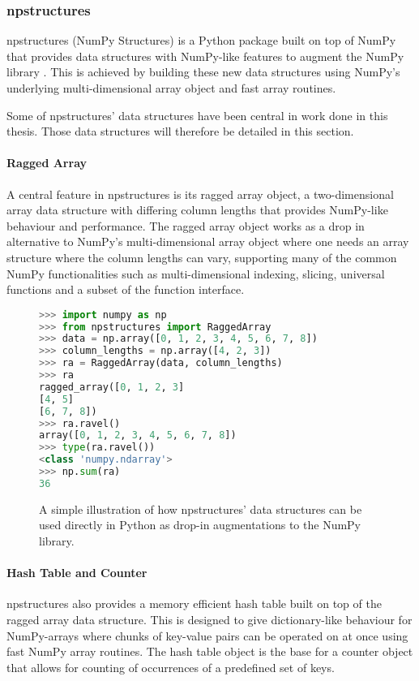 \subsubsection{npstructures} \label{background:implementation_tools_and_libraries:npstructures}
npstructures (NumPy Structures) is a Python package built on top of NumPy that provides data structures with NumPy-like features to augment the NumPy library \cite{npstructures}.
This is achieved by building these new data structures using NumPy's underlying multi-dimensional array object and fast array routines.

Some of npstructures' data structures have been central in work done in this thesis.
Those data structures will therefore be detailed in this section.

\paragraph{Ragged Array}
A central feature in npstructures is its ragged array object, a two-dimensional array data structure with differing column lengths that provides NumPy-like behaviour and performance.
The ragged array object works as a drop in alternative to NumPy's multi-dimensional array object where one needs an array structure where the column lengths can vary, supporting many of the common NumPy functionalities such as multi-dimensional indexing, slicing, universal functions and a subset of the function interface.
\begin{figure}[H]
\begin{lstlisting}[language=Python,style=console]
>>> import numpy as np
>>> from npstructures import RaggedArray
>>> data = np.array([0, 1, 2, 3, 4, 5, 6, 7, 8])
>>> column_lengths = np.array([4, 2, 3])
>>> ra = RaggedArray(data, column_lengths)
>>> ra
ragged_array([0, 1, 2, 3]
[4, 5]
[6, 7, 8])
>>> ra.ravel()
array([0, 1, 2, 3, 4, 5, 6, 7, 8])
>>> type(ra.ravel())
<class 'numpy.ndarray'>
>>> np.sum(ra)
36
\end{lstlisting}
\caption{
  A simple illustration of how npstructures' data structures can be used directly in Python as drop-in augmentations to the NumPy library.
}
\label{background:implementation_tools_and_libraries:npstructures:figure:ragged_array_example}
\end{figure}

\paragraph{Hash Table and Counter}
npstructures also provides a memory efficient hash table built on top of the ragged array data structure.
This is designed to give dictionary-like behaviour for NumPy-arrays where chunks of key-value pairs can be operated on at once using fast NumPy array routines.
The hash table object is the base for a counter object that allows for counting of occurrences of a predefined set of keys.

